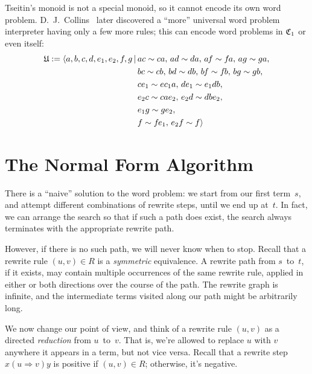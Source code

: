\documentclass[../generics]{subfiles}
\begin{document}
Tseitin's monoid is not a special monoid, so it cannot encode its own word problem. D.~J.~Collins~\cite{universalsemigroup} later discovered a ``more'' universal word problem interpreter having only a few more rules; this can encode word problems in $\mathfrak{C}_1$ or even itself:
\begin{align*}
\mathfrak{U} := \langle  a,b,c,d,e_1,e_2,f\hspace{-0.08em} ,g\,|\,&ac\sim ca,\,ad\sim da,\,a\hspace{-0.08em} f\sim f\hspace{-0.08em} a,\,ag\sim ga,\\
&bc\sim cb,\, bd\sim db,\, b\hspace{-0.08em} f\sim f\hspace{-0.08em} b,\, bg\sim gb,\\
&ce_1\sim ec_1a,\, de_1\sim e_1db,\\
&e_2c\sim cae_2,\, e_2d\sim dbe_2,\\
&e_1g\sim ge_2,\\
&f\sim f\hspace{-0.08em} e_1,\, e_2f\sim f\rangle
\end{align*}

\section{The Normal Form Algorithm}\label{rewritesystemintro}

There is a ``naive'' solution to the word problem: we start from our first term~$s$, and attempt different combinations of rewrite steps, until we end up at~$t$. In fact, we can arrange the search so that if such a path does exist, the search always terminates with the appropriate rewrite path.

However, if there is no such path, we will never know when to stop. Recall that a rewrite rule $(u, v)\in R$ is a \emph{symmetric} equivalence. A rewrite path from $s$~to~$t$, if it exists, may contain multiple occurrences of the same rewrite rule, applied in either or both directions over the course of the path. The rewrite graph is infinite, and the intermediate terms visited along our path might be arbitrarily long.

\begin{center}
\end{center}

We now change our point of view, and think of a rewrite rule $(u,v)$ as a directed \emph{reduction} from $u$~to~$v$. That is, we're allowed to replace $u$ with $v$ anywhere it appears in a term, but not vice versa. Recall that a rewrite step $x(u\Rightarrow v)y$ is positive if $(u,v)\in R$; otherwise, it's negative.
\end{document}
